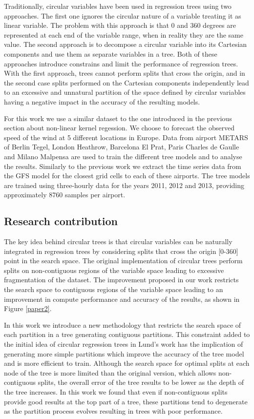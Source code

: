 Traditionally, circular variables have been used in regression trees using two approaches. The first one ignores the circular nature of a variable treating it as linear variable. The problem with this approach is that 0 and 360 degrees are represented at each end of the variable range, when in reality they are the same value. The second approach is to decompose a circular variable into its Cartesian components and use them as separate variables in a tree. Both of these approaches introduce constrains and limit the performance of regression trees. With the first approach, trees cannot perform splits that cross the origin, and in the second case splits performed on the Cartesian components independently lead to an excessive and unnatural partition of the space defined by circular variables having a negative impact in the accuracy of the resulting models. 

For this work we use a similar dataset to the one introduced in the previous section about non-linear kernel regession. We choose to forecast the observed speed of the wind at 5 different locations in Europe. Data from airport METARS of Berlin Tegel, London Heathrow, Barcelona El Prat, Paris Charles de Gaulle and Milano Malpensa are used to train the different tree models and to analyse the results. Similarly to the previous work we extract the time series data from the GFS model for the closest grid cells to each of these airports. The tree models are trained using three-hourly data for the years 2011, 2012 and 2013, providing approximately 8760 samples per airport.


\subsection{Research contribution}
The key idea behind circular trees is that circular variables can be naturally integrated in regression trees by considering splits that cross the origin [0-360] point in the search space. The original implementation of circular trees perform splits on non-contiguous regions of the variable space leading to excessive fragmentation of the dataset. The improvement proposed in our work restricts the search space to contiguous regions of the variable space leading to an improvement in compute performance and accuracy of the results, as shown in Figure \ref{paper2}.

In this work we introduce a new methodology that restricts the search space of each partition in a tree generating contiguous partitions. This constraint added to the initial idea of circular regression trees in Lund's work \citep{lund2002tree} has the implication of generating more simple partitions which improve the accuracy of the tree model and is more efficient to train. Although the search space for optimal splits at each node of the tree is more limited than the original version, which allows non-contiguous splits, the overall error of the tree results to be lower as the depth of the tree increases. In this work we found that even if non-contiguous splits provide good results at the top part of a tree, these partitions tend to degenerate as the partition process evolves resulting in trees with poor performance.

